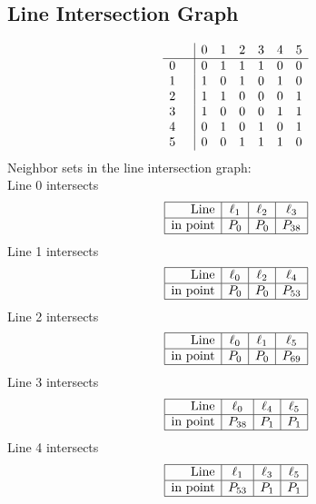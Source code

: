 \documentclass{article}
\begin{document}
{\subsection*{Line Intersection Graph}
{\arraycolsep=1pt
$$
\begin{array}{rr|*{6}r}
 &  & 0 & 1 & 2 & 3 & 4 & 5\\
\hline
0 &  & 0 & 1 & 1 & 1 & 0 & 0\\
1 &  & 1 & 0 & 1 & 0 & 1 & 0\\
2 &  & 1 & 1 & 0 & 0 & 0 & 1\\
3 &  & 1 & 0 & 0 & 0 & 1 & 1\\
4 &  & 0 & 1 & 0 & 1 & 0 & 1\\
5 &  & 0 & 0 & 1 & 1 & 1 & 0\\
\end{array}
$$
}%
Neighbor sets in the line intersection graph:\\
Line 0 intersects 
$$
\begin{array}{|r*{3}{|c}|}
\hline
\mbox{Line}  & \ell_{1} & \ell_{2} & \ell_{3}\\
\hline
\mbox{in point}  & P_{0} & P_{0} & P_{38}\\
\hline
\end{array}
$$
Line 1 intersects 
$$
\begin{array}{|r*{3}{|c}|}
\hline
\mbox{Line}  & \ell_{0} & \ell_{2} & \ell_{4}\\
\hline
\mbox{in point}  & P_{0} & P_{0} & P_{53}\\
\hline
\end{array}
$$
Line 2 intersects 
$$
\begin{array}{|r*{3}{|c}|}
\hline
\mbox{Line}  & \ell_{0} & \ell_{1} & \ell_{5}\\
\hline
\mbox{in point}  & P_{0} & P_{0} & P_{69}\\
\hline
\end{array}
$$
Line 3 intersects 
$$
\begin{array}{|r*{3}{|c}|}
\hline
\mbox{Line}  & \ell_{0} & \ell_{4} & \ell_{5}\\
\hline
\mbox{in point}  & P_{38} & P_{1} & P_{1}\\
\hline
\end{array}
$$
Line 4 intersects 
$$
\begin{array}{|r*{3}{|c}|}
\hline
\mbox{Line}  & \ell_{1} & \ell_{3} & \ell_{5}\\
\hline
\mbox{in point}  & P_{53} & P_{1} & P_{1}\\
\hline
\end{array}
$$}
\end{document}
